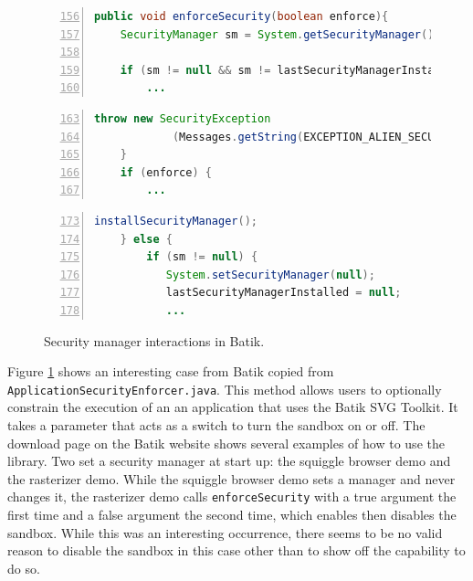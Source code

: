 \documentclass{sig-alternate}
\begin{document}
\begin{figure}
\begin{lstlisting}[language=Java,numbers=left,basicstyle={\scriptsize},breaklines=true,firstnumber=156,xrightmargin={0.1cm},numbersep={-10pt}]
    public void enforceSecurity(boolean enforce){ 
    SecurityManager sm = System.getSecurityManager();

    if (sm != null && sm != lastSecurityManagerInstalled){
        ...
\end{lstlisting}


\begin{lstlisting}[language=Java,numbers=left,basicstyle={\scriptsize},breaklines=true,firstnumber=163,xrightmargin={0.1cm},numbersep={-10pt}]
        throw new SecurityException
            (Messages.getString(EXCEPTION_ALIEN_SECURITY_MANAGER));   
    }                  
    if (enforce) { 
        ...
\end{lstlisting}


\begin{lstlisting}[language=Java,numbers=left,basicstyle={\scriptsize},breaklines=true,firstnumber=173,xrightmargin={0.1cm},numbersep={-10pt}]
        installSecurityManager();         
    } else {             
        if (sm != null) {                 
           System.setSecurityManager(null);
           lastSecurityManagerInstalled = null;             
           ...
\end{lstlisting}


\protect\caption{Security manager interactions in Batik.}\label{fig:Batik-snippet}
\end{figure}


Figure \ref{fig:Batik-snippet} shows an interesting case from Batik
copied from \texttt{ApplicationSecurityEnforcer.java}. This method
allows users to optionally constrain the execution of an an application
that uses the Batik SVG Toolkit. It takes a parameter that acts as
a switch to turn the sandbox on or off. The download page on the Batik
website shows several examples of how to use the library. Two set
a security manager at start up: the squiggle browser demo and the
rasterizer demo. While the squiggle browser demo sets a manager and
never changes it, the rasterizer demo calls \texttt{enforceSecurity}
with a true argument the first time and a false argument the second
time, which enables then disables the sandbox. While this was an interesting
occurrence, there seems to be no valid reason to disable the sandbox
in this case other than to show off the capability to do so.
\end{document}
